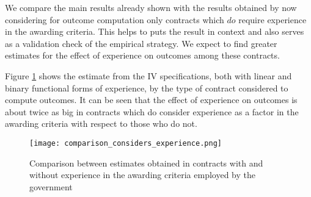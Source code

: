 We compare the main results already shown with the results obtained by now considering for outcome computation only contracts which $do$ require experience in the awarding criteria. This helps to puts the result in context and also serves as a validation check of the empirical strategy. We expect to find greater estimates for the effect of experience on outcomes among these contracts.

Figure \ref{fig:comparison_considers_experience} shows the estimate from the IV specifications, both with linear and binary functional forms of experience, by the type of contract considered to compute outcomes. It can be seen that the effect of experience on outcomes is about twice as big in contracts which do consider experience as a factor in the awarding criteria with respect to those who do not.

\begin{figure}[H]
  \texttt{[image: comparison\_considers\_experience.png]}
  \caption{Comparison between estimates obtained in contracts with and without experience in the awarding criteria employed by the government}
  \label{fig:comparison_considers_experience}
\end{figure}




%


